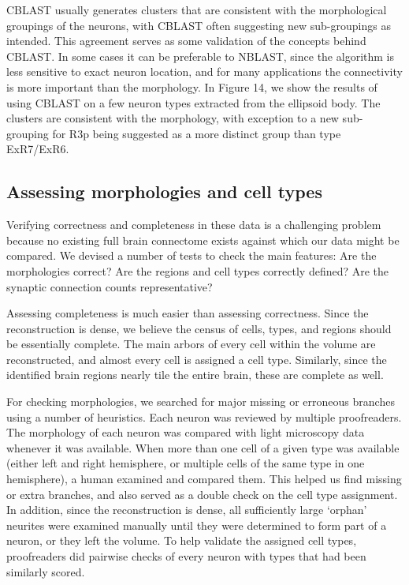 \documentclass{article}
\begin{document}
CBLAST usually generates clusters that are consistent with the morphological groupings of the neurons, with CBLAST often suggesting new sub-groupings as intended. This agreement serves as some validation of the concepts behind CBLAST. In some cases it can be preferable to NBLAST, since the algorithm is less sensitive to exact neuron location, and for many applications the connectivity is more important than the morphology. In Figure 14, we show the results of using CBLAST on a few neuron types extracted from the ellipsoid body. The clusters are consistent with the morphology, with exception to a new sub-grouping for R3p being suggested as a more distinct group than type ExR7/ExR6.

\subsection*{Assessing morphologies and cell types}

Verifying correctness and completeness in these data is a challenging problem because no existing full brain connectome exists against which our data might be compared. We devised a number of tests to check the main features: Are the morphologies correct? Are the regions and cell types correctly defined? Are the synaptic connection counts representative?

Assessing completeness is much easier than assessing correctness. Since the reconstruction is dense, we believe the census of cells, types, and regions should be essentially complete. The main arbors of every cell within the volume are reconstructed, and almost every cell is assigned a cell type. Similarly, since the identified brain regions nearly tile the entire brain, these are complete as well.

For checking morphologies, we searched for major missing or erroneous branches using a number of heuristics. Each neuron was reviewed by multiple proofreaders. The morphology of each neuron was compared with light microscopy data whenever it was available. When more than one cell of a given type was available (either left and right hemisphere, or multiple cells of the same type in one hemisphere), a human examined and compared them. This helped us find missing or extra branches, and also served as a double check on the cell type assignment. In addition, since the reconstruction is dense, all sufficiently large ‘orphan’ neurites were examined manually until they were determined to form part of a neuron, or they left the volume. To help validate the assigned cell types, proofreaders did pairwise checks of every neuron with types that had been similarly scored.
\end{document}
